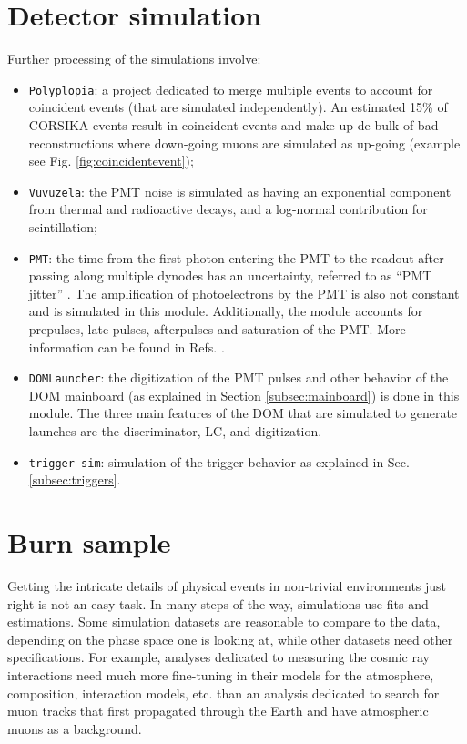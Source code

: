 \section{Detector simulation}
Further processing of the simulations involve:
\begin{itemize}
\item \texttt{Polyplopia}: a project dedicated to merge multiple events to account for coincident events (that are simulated independently). An estimated 15\% of CORSIKA events result in coincident events and make up de bulk of bad reconstructions where down-going muons are simulated as up-going (example see Fig. \ref{fig:coincidentevent});
\item \texttt{Vuvuzela}: the PMT noise is simulated as having an exponential component from  thermal and radioactive decays, and a log-normal contribution for scintillation;
\item \texttt{PMT}: the time from the first photon entering the PMT to the readout after passing along multiple dynodes has an uncertainty, referred to as ``PMT jitter'' . The amplification of photoelectrons by the PMT is also not constant and is simulated in this module. Additionally, the module accounts for prepulses, late pulses, afterpulses and saturation of the PMT. More information can be found in Refs. \cite{Abbasi:2010vc,Ma:2009aw}.
\item \texttt{DOMLauncher}: the digitization of the PMT pulses and other behavior of the DOM mainboard (as explained in Section \ref{subsec:mainboard}) is done in this module. The three main features of the DOM that are simulated to generate launches are the discriminator, LC, and digitization.
\item \texttt{trigger-sim}: simulation of the trigger behavior as explained in Sec. \ref{subsec:triggers}.
\end{itemize}


\section{Burn sample}
Getting the intricate details of physical events in non-trivial environments just right is not an easy task. In many steps of the way, simulations use fits and estimations. Some simulation datasets are reasonable to compare to the data, depending on the phase space one is looking at, while other datasets need other specifications. For example, analyses dedicated to measuring the cosmic ray interactions need much more fine-tuning in their models for the atmosphere, composition, interaction models, etc. than an analysis dedicated to search for muon tracks that first propagated through the Earth and have atmospheric muons as a background.

